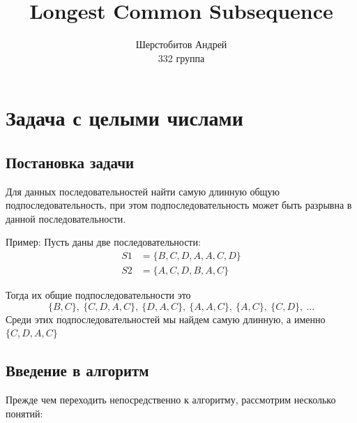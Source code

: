 \documentclass[12pt]{article}
\title{Longest Common Subsequence}
\author{Шерстобитов Андрей \\
         332 группа}
\begin{document}
\maketitle
    \newpage
\tableofcontents
    \newpage

\section{Задача с целыми числами}

\subsection{Постановка задачи}
 Для данных последовательностей найти самую длинную общую подпоследовательность, при этом
подпоследовательность может быть разрывна в данной последовательности.

Пример: Пусть даны две последовательности:
\begin{align*}
    S1 &= \{B, C, D, A, A, C, D\} \\
    S2 &= \{A, C, D, B, A, C\}
\end{align*}

Тогда их общие подпоследовательности это
$$\{B, C\},\ \{C, D, A, C\},\ \{D, A, C\},\ \{A, A, C\},\ \{A, C\},\ \{C, D\},\ ...$$
Среди этих подпоследовательностей мы найдем
самую длинную, а именно $\{C, D, A, C\}$
\subsection{Введение в алгоритм}
Прежде чем переходить непосредственно к алгоритму,
    рассмотрим несколько понятий:
\end{document}
